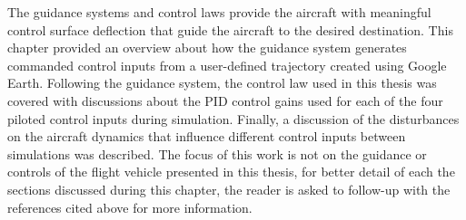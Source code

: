 The guidance systems and control laws provide the aircraft with meaningful control surface deflection that guide the aircraft to the desired destination. This chapter provided an overview about how the guidance system generates commanded control inputs from a user-defined trajectory created using Google Earth. Following the guidance system, the control law used in this thesis was covered with discussions about the PID control gains used for each of the four piloted control inputs during simulation. Finally, a discussion of the disturbances on the aircraft dynamics that influence different control inputs between simulations was described. The focus of this work is not on the guidance or controls of the flight vehicle presented in this thesis, for better detail of each the sections discussed during this chapter, the reader is asked to follow-up with the references cited above for more information.